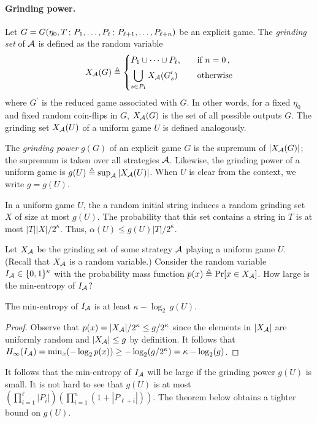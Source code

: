 \paragraph{Grinding power.}
Let $G = G(\eta_0,T\,;\, P_1, \ldots, P_\ell \,;\, P_{\ell+1}, \ldots, P_{\ell+n})$ be an explicit game. 
The \emph{grinding set} of $\mathcal{A}$ is defined as the random variable 
\[
    X_{\mathcal{A}}(G) 
    \triangleq 
        \begin{dcases}
            P_1 \cup \cdots \cup P_\ell, &\quad\text{if $n = 0$}\,, \\
            \bigcup_{s \in P_1} X_{\mathcal{A}}(G^\prime_s)\, &\quad\text{otherwise}
        \end{dcases}        
\] 
where $G^\prime$ is the reduced game associated with $G$. 
In other words, 
for a fixed $\eta_0$ and fixed random coin-flips in $G$,
$X_{\mathcal{A}}(G)$ is the set of all possible outputs $G$. 
The grinding set $X_{\mathcal{A}}(U)$ of a uniform game $U$ is defined analogously.

\begin{definition}
    \label{def:xor-game-grinding-power} 
    The \emph{grinding power} $g(G)$ of an explicit game $G$ 
    is the supremum
    of $|X_{\mathcal{A}}(G)|$; 
    the supremum is taken over all strategies $\mathcal{A}$.
    Likewise, the grinding power of a uniform game is 
    $g(U) \triangleq \sup_{\mathcal{A}} |X_{\mathcal{A}}(U)|$. 
    When $U$ is clear from the context, we write $g = g(U)$.
\end{definition}
In a uniform game $U$, the 
a random initial string induces 
a random grinding set $X$ of size at most $g(U)$. 
The probability that this set contains a string in $T$ 
is at most $|T| |X|/2^\kappa$. 
Thus, $\alpha(U) \leq g(U) |T|/2^\kappa$. 


Let $X_{\mathcal{A}}$ be the grinding set of some strategy $\mathcal{A}$ 
playing a uniform game $U$. 
(Recall that $X_{\mathcal{A}}$ is a random variable.)
Consider the random variable $I_{\mathcal{A}} \in \{0,1\}^\kappa$ 
with the probability mass function $p(x) \triangleq \Pr[x \in X_{\mathcal{A}}]$. 
How large is the min-entropy of $I_{\mathcal{A}}$? 


\begin{lemma}\label{lemma:xor-game-minentropy}
The min-entropy of $I_{\mathcal{A}}$ is at least 
$
    \kappa - \log_2\,g(U)
$.
\end{lemma}
\begin{proof}
Observe that 
$
    p(x) 
    = {|X_{\mathcal{A}}|/2^\kappa} 
    \leq {g/2^\kappa}
$ 
since the elements in $|X_{\mathcal{A}}|$ are uniformly random 
and $|X_{\mathcal{A}}| \leq g$ by definition.
It follows that 
$
    H_\infty(I_{\mathcal{A}}) 
    = \min_x (-\log_2 p(x)) 
    \geq -\log_2 (g/2^\kappa) 
    = \kappa - \log_2(g)
$.
\end{proof}
It follows that the min-entropy of $I_{\mathcal{A}}$ will be large  
if the grinding power $g(U)$ is small. 
It is not hard to see that $g(U)$ is at most 
$\left(\prod_{i=1}^{\ell} |P_i|\right)
\left(\prod_{i=1}^{n} (1 + |P_{\ell + i}|) \right)$. 
The theorem below obtains a tighter bound on $g(U)$.

